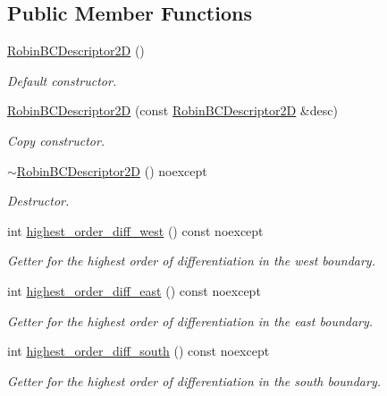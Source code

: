 \subsection*{Public Member Functions}
\begin{DoxyCompactItemize}
\item 
\hyperlink{classmtk_1_1RobinBCDescriptor2D_a00589475c84facde18949150bd6df961}{Robin\+B\+C\+Descriptor2\+D} ()
\begin{DoxyCompactList}\small\item\em Default constructor. \end{DoxyCompactList}\item 
\hyperlink{classmtk_1_1RobinBCDescriptor2D_a996e5ddee3a6f76cb5fa813bfff905d5}{Robin\+B\+C\+Descriptor2\+D} (const \hyperlink{classmtk_1_1RobinBCDescriptor2D}{Robin\+B\+C\+Descriptor2\+D} \&desc)
\begin{DoxyCompactList}\small\item\em Copy constructor. \end{DoxyCompactList}\item 
\hyperlink{classmtk_1_1RobinBCDescriptor2D_a75351b00a9e306f468d1733ce38dff5f}{$\sim$\+Robin\+B\+C\+Descriptor2\+D} () noexcept
\begin{DoxyCompactList}\small\item\em Destructor. \end{DoxyCompactList}\item 
int \hyperlink{classmtk_1_1RobinBCDescriptor2D_ac75fc5f402e3f6e6d4f1e253f8ada98c}{highest\+\_\+order\+\_\+diff\+\_\+west} () const noexcept
\begin{DoxyCompactList}\small\item\em Getter for the highest order of differentiation in the west boundary. \end{DoxyCompactList}\item 
int \hyperlink{classmtk_1_1RobinBCDescriptor2D_aebe62f9ae39b02f9c029257d6e6381af}{highest\+\_\+order\+\_\+diff\+\_\+east} () const noexcept
\begin{DoxyCompactList}\small\item\em Getter for the highest order of differentiation in the east boundary. \end{DoxyCompactList}\item 
int \hyperlink{classmtk_1_1RobinBCDescriptor2D_a6aaa1f5a3dc46446acd66209f1519410}{highest\+\_\+order\+\_\+diff\+\_\+south} () const noexcept
\begin{DoxyCompactList}\small\item\em Getter for the highest order of differentiation in the south boundary. \end{DoxyCompactList}\item 

\end{DoxyCompactItemize}
